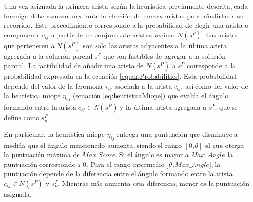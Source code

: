 
Una vez asignada la primera arista seg\'un la heur\'istica previamente descrita, cada hormiga debe avanzar mediante la elecci\'on de nuevas aristas para a\~nadirlas a su recorrido. Este procedimiento corresponde a la probabilidad de elegir una arista o componente $c_{ij}$ a partir de un conjunto de aristas vecinas $N(s^{P})$. Las aristas que pertenecen a $N(s^{P})$ son solo las aristas adyacentes a la \'ultima arista agregada a la soluci\'on parcial $s^P$ que son factibles de agregar a la soluci\'on parcial. La factibilidad de a\~nadir una arista de $N(s^{P})$ a $s^{P}$ corresponde a la probabilidad expresada en la ecuaci\'on \ref{eq:antProbabilities}. Esta probabilidad depende del valor de la feromona $\tau_{ij}$ asociada a la arista $c_{ij}$, as\'i como del valor de la heur\'istica miope $\eta_{ij}$ (ecuaci\'on \ref{eq:heuristicaMiope}) que eval\'ua el \'angulo formando entre la arista $c_{ij} \in N(s^{P})$ y la \'ultima arista agregada a $s^{P}$, que se define como $s_{n}^{P}$.


En particular, la heur\'istica miope $\eta_{ij}$ entrega una puntuaci\'on que disminuye a medida que el \'angulo mencionado aumenta, siendo el rango $[0, \theta]$ el que otorga la puntuaci\'on m\'axima de $Max\_Score$. Si el \'angulo es mayor a $Max\_Angle$ la puntuaci\'on corresponde a 0. Para el rango intermedio $]\theta, Max\_Angle]$, la puntuaci\'on depende de la diferencia entre el \'angulo formando entre la arista $c_{ij} \in N(s^{P})$ y $s_{n}^{P}$. Mientras m\'as aumenta esta diferencia, menor es la puntuaci\'on asignada.



